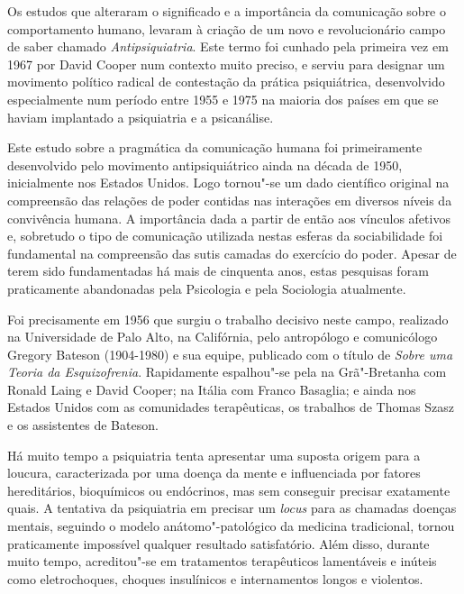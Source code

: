 Os estudos que alteraram o significado e a importância da comunicação
sobre o comportamento humano, levaram à criação de um novo e
revolucionário campo de saber chamado \emph{Antipsiquiatria}. Este termo
foi cunhado pela primeira vez em 1967 por David Cooper num contexto
muito preciso, e serviu para designar um movimento político radical de
contestação da prática psiquiátrica, desenvolvido especialmente num
período entre 1955 e 1975 na maioria dos países em que se haviam
implantado a psiquiatria e a psicanálise.

Este estudo sobre a pragmática da comunicação humana foi primeiramente
desenvolvido pelo movimento antipsiquiátrico ainda na década de 1950,
inicialmente nos Estados Unidos. Logo tornou"-se um dado científico
original na compreensão das relações de poder contidas nas interações em
diversos níveis da convivência humana. A importância dada a partir de
então aos vínculos afetivos e, sobretudo o tipo de comunicação utilizada
nestas esferas da sociabilidade foi fundamental na compreensão das sutis
camadas do exercício do poder. Apesar de terem sido fundamentadas há
mais de cinquenta anos, estas pesquisas foram praticamente abandonadas
pela Psicologia e pela Sociologia atualmente.

Foi precisamente em 1956 que surgiu o trabalho decisivo neste campo,
realizado na Universidade de Palo Alto, na Califórnia, pelo antropólogo
e comunicólogo Gregory Bateson (1904-1980) e sua equipe, publicado com o
título de \emph{Sobre uma Teoria da Esquizofrenia}. Rapidamente
espalhou"-se pela na Grã"-Bretanha com Ronald Laing e David Cooper; na
Itália com Franco Basaglia; e ainda nos Estados Unidos com as
comunidades terapêuticas, os trabalhos de Thomas Szasz e os assistentes
de Bateson.

Há muito tempo a psiquiatria tenta apresentar uma suposta origem para a
loucura, caracterizada por uma doença da mente e influenciada por
fatores hereditários, bioquímicos ou endócrinos, mas sem conseguir
precisar exatamente quais. A tentativa da psiquiatria em precisar um
\emph{locus} para as chamadas doenças mentais, seguindo o modelo
anátomo"-patológico da medicina tradicional, tornou praticamente
impossível qualquer resultado satisfatório. Além disso, durante muito
tempo, acreditou"-se em tratamentos terapêuticos lamentáveis e inúteis
como eletrochoques, choques insulínicos e internamentos longos e
violentos.

